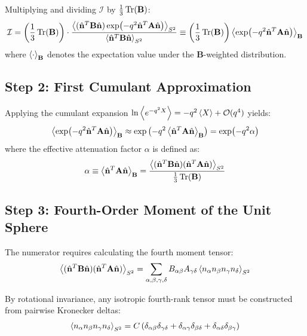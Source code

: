 \documentclass[11pt,a4paper]{article}
\begin{document}
Multiplying and dividing $\mathcal{I}$ by $\frac{1}{3} \Tr(\mathbf{B})$:
\begin{equation}
\mathcal{I} = \left( \frac{1}{3} \Tr(\mathbf{B}) \right) \cdot \frac{\ev{(\hat{\mathbf{n}}^T \mathbf{B} \hat{\mathbf{n}}) \exp(-q^2 \hat{\mathbf{n}}^T \mathbf{A} \hat{\mathbf{n}})}_{S^2}}{\ev{\hat{\mathbf{n}}^T \mathbf{B} \hat{\mathbf{n}}}_{S^2}} \equiv \left( \frac{1}{3} \Tr(\mathbf{B}) \right) \ev{\exp(-q^2 \hat{\mathbf{n}}^T \mathbf{A} \hat{\mathbf{n}})}_{\mathbf{B}}
\end{equation}
where $\ev{\cdot}_{\mathbf{B}}$ denotes the expectation value under the $\mathbf{B}$-weighted distribution.

\subsection{Step 2: First Cumulant Approximation}
Applying the cumulant expansion $\ln \ev{e^{-q^2 X}} = -q^2 \ev{X} + \mathcal{O}(q^4)$ yields:
\begin{equation}
\ev{\exp(-q^2 \hat{\mathbf{n}}^T \mathbf{A} \hat{\mathbf{n}})}_{\mathbf{B}} \approx \exp\left( -q^2 \ev{\hat{\mathbf{n}}^T \mathbf{A} \hat{\mathbf{n}}}_{\mathbf{B}} \right) = \exp(-q^2 \alpha)
\end{equation}
where the effective attenuation factor $\alpha$ is defined as:
\begin{equation}
\alpha \equiv \ev{\hat{\mathbf{n}}^T \mathbf{A} \hat{\mathbf{n}}}_{\mathbf{B}} = \frac{\ev{(\hat{\mathbf{n}}^T \mathbf{B} \hat{\mathbf{n}})(\hat{\mathbf{n}}^T \mathbf{A} \hat{\mathbf{n}})}_{S^2}}{\frac{1}{3} \Tr(\mathbf{B})}
\label{eq:alpha_def}
\end{equation}

\subsection{Step 3: Fourth-Order Moment of the Unit Sphere}
The numerator requires calculating the fourth moment tensor:
\begin{equation}
\ev{(\hat{\mathbf{n}}^T \mathbf{B} \hat{\mathbf{n}})(\hat{\mathbf{n}}^T \mathbf{A} \hat{\mathbf{n}})}_{S^2} = \sum_{\alpha, \beta, \gamma, \delta} B_{\alpha\beta} A_{\gamma\delta} \ev{n_\alpha n_\beta n_\gamma n_\delta}_{S^2}
\end{equation}

By rotational invariance, any isotropic fourth-rank tensor must be constructed from pairwise Kronecker deltas:
\begin{equation}
\ev{n_\alpha n_\beta n_\gamma n_\delta}_{S^2} = C \left( \delta_{\alpha\beta} \delta_{\gamma\delta} + \delta_{\alpha\gamma} \delta_{\beta\delta} + \delta_{\alpha\delta} \delta_{\beta\gamma} \right)
\end{equation}
\end{document}
